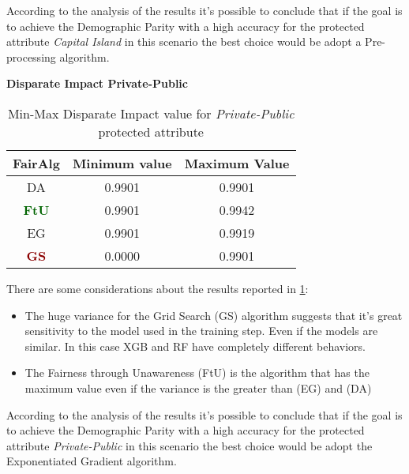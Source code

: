 According to the analysis of the results it's possible to conclude that if the goal is to achieve the Demographic Parity with a high accuracy for the protected attribute \emph{Capital Island} in this scenario the best choice would be adopt a Pre-processing algorithm.

\textbf{Disparate Impact Private-Public}
\begin{table}
    \centering
    \begin{tabular}{|c|c|c|}
        \hline
        \textbf{FairAlg} & \textbf{Minimum value} & \textbf{Maximum Value} \\
        \hline
        DA & 0.9901 & 0.9901 \\
        \hline
        \textcolor{darkgreen}{\textbf{FtU}} & 0.9901 & 0.9942 \\
        \hline
        EG & 0.9901 & 0.9919 \\
        \hline
        \textcolor{darkred}{\textbf{GS}} & 0.0000 & 0.9901 \\
        \hline
    \end{tabular}
    \caption{Min-Max Disparate Impact value for \emph{Private-Public} protected attribute}
    \label{tab:pp_di}
\end{table}

There are some considerations about the results reported in \cref{tab:pp_di}:

\begin{itemize}

    \item The huge variance for the Grid Search (GS) algorithm suggests that it's great sensitivity to the model used in the training step. Even if the models are similar. In this case XGB and RF have completely different behaviors.

    \item The Fairness through Unawareness (FtU) is the algorithm that has the maximum value even if the variance is the greater than (EG) and (DA)

\end{itemize}

According to the analysis of the results it's possible to conclude that if the goal is to achieve the Demographic Parity with a high accuracy for the protected attribute \emph{Private-Public} in this scenario the best choice would be adopt the Exponentiated Gradient algorithm.

